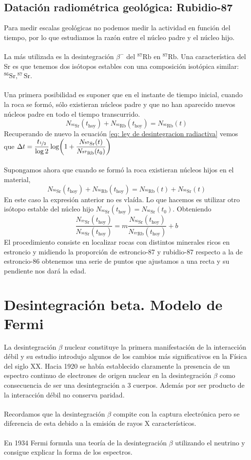 \subsection{Datación radiométrica geológica: Rubidio-87}
Para medir escalas geológicas no podemos medir la actividad en función del tiempo, por lo que estudiamos la razón entre el núcleo padre y el núcleo hijo.\\\\
La más utilizada es la desintegración $\beta^- $ del $^{87}\mathrm{Rb}$ en $^{87} \mathrm{Rb}$. Una característica del Sr es que tenemos dos isótopos estables con una composición isotópica similar: $^{86}\mathrm{Sr}, ^{87}\mathrm{Sr}$.\\\\
Una primera posibilidad es suponer que en el instante de tiempo inicial, cuando la roca se formó, sólo existieran núcleos padre y que no han aparecido nuevos núcleos padre en todo el tiempo transcurrido. $$N_{^{86}\mathrm{Sr}}(t_\mathrm{hoy})+N_{^{86}\mathrm{Rb}}(t_\mathrm{hoy})=N_{^{86}\mathrm{Rb}}(t)$$ Recuperando de nuevo la ecuación \ref{eq: ley de desintegracion radiactiva} vemos que 
$\Delta t=\dfrac{t_{\nicefrac{1}{2}}}{\log 2} \log(1+\dfrac{N_{^{87}\mathrm{Sr}}(t)}{N_{^{87}\mathrm{Rb}}(t_0)})$\\\\
Supongamos ahora que cuando se formó la roca existieran núcleos hijos en el material, 
$$N_{^{86}\mathrm{Sr}}(t_\mathrm{hoy})+N_{^{86}\mathrm{Rb}}(t_\mathrm{hoy})=N_{^{86}\mathrm{Rb}}(t)+N_{^{86}\mathrm{Sr}}(t)$$
En este caso la expresión anterior no es vlaída. Lo que hacemos es utilizar otro isótopo estable del núcleo hijo $N_{^{86}\mathrm{Sr}}(t_\mathrm{hoy})=N_{^{86}\mathrm{Sr}}(t_0)$. Obteniendo $$\frac{N_{^{87}\mathrm{Sr}}(t_\mathrm{hoy})}{N_{^{86}\mathrm{Sr}}(t_\mathrm{hoy})}=m\frac{N_{^{86}\mathrm{Sr}}(t_\mathrm{hoy})}{N_{^{87}\mathrm{Rb}}(t_\mathrm{hoy})}+b$$
El procedimiento consiste en localizar rocas con distintos minerales ricos en estroncio y midiendo la proporción de estroncio-87 y rubidio-87 respecto a la de estroncio-86 obtenemos una serie de puntos que ajustamos a una recta y su pendiente nos dará la edad.
\section{Desintegración beta. Modelo de Fermi}

La desintegración $\beta$ nuclear constituye la primera manifestación de la interacción débil y su estudio introdujo algunos de los cambios más significativos en la Física del siglo XX. Hacia 1920 se había establecido claramente la presencia de un espectro continuo de electrones de origen nuclear en la desintegración $\beta$ como consecuencia de ser una desintegración a 3 cuerpos. Además por ser producto de la interacción débil no conserva paridad.\\\\
Recordamos que la desintegración $\beta$ compite con la captura electrónica pero se diferencia de esta debido a la emisión de rayos X característicos.\\\\ 
En 1934 Fermi formula una teoría de la desintegración $\beta$ utilizando el neutrino y consigue explicar la forma de los espectros.
\newpage
